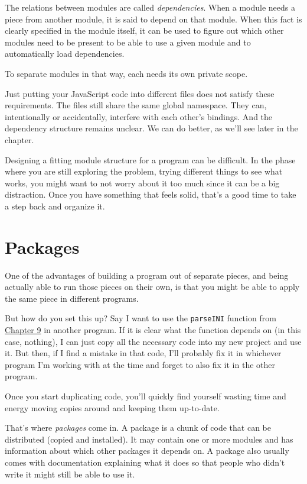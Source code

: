 The relations between modules are called \emph{dependencies}. When a module needs a piece from another module, it is said to depend on that module. When this fact is clearly specified in the module itself, it can be used to figure out which other modules need to be present to be able to use a given module and to automatically load dependencies.

To separate modules in that way, each needs its own private scope.

Just putting your JavaScript code into different files does not satisfy these requirements. The files still share the same global namespace. They can, intentionally or accidentally, interfere with each other's bindings. And the dependency structure remains unclear. We can do better, as we'll see later in the chapter.

Designing a fitting module structure for a program can be difficult. In the phase where you are still exploring the problem, trying different things to see what works, you might want to not worry about it too much since it can be a big distraction. Once you have something that feels solid, that's a good time to take a step back and organize it.

\section{Packages}

One of the advantages of building a program out of separate pieces, and being actually able to run those pieces on their own, is that you might be able to apply the same piece in different programs.

But how do you set this up? Say I want to use the \lstinline`parseINI` function from \hyperref[regexp.ini]{Chapter 9} in another program. If it is clear what the function depends on (in this case, nothing), I can just copy all the necessary code into my new project and use it. But then, if I find a mistake in that code, I'll probably fix it in whichever program I'm working with at the time and forget to also fix it in the other program.

Once you start duplicating code, you'll quickly find yourself wasting time and energy moving copies around and keeping them up-to-date.

That's where \emph{packages} come in. A package is a chunk of code that can be distributed (copied and installed). It may contain one or more modules and has information about which other packages it depends on. A package also usually comes with documentation explaining what it does so that people who didn't write it might still be able to use it.

